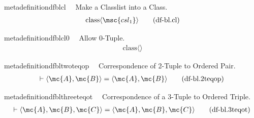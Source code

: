 \begin{restatable}{metadefinition}{dfblcl}~~ Make a Classlist into a Class.
\begin{align}
\,\mathrm{class} \langle \msc{csl_1} \rangle\label{eq:df-bl.cl}\tag{df-bl.cl}
\end{align}
\end{restatable}

\begin{restatable}{metadefinition}{dfblcl0}~~ Allow 0-Tuple.
\begin{align}
\,\mathrm{class} \langle \rangle\label{eq:df-bl.cl0}\tag{df-bl.cl0}
\end{align}
\end{restatable}

\begin{restatable}{metadefinition}{dfbltwoteqop}~~ Correspondence of 2-Tuple to
Ordered Pair.
\begin{align}
\vdash \langle \mc{A} , \mc{B} \rangle = \langle \mc{A} , \mc{B}
    \rangle\label{eq:df-bl.2teqop}\tag{df-bl.2teqop}
\end{align}
\end{restatable}

\begin{restatable}{metadefinition}{dfblthreeteqot}~~ Correspondence of a 3-Tuple to
Ordered Triple.
\begin{align}
\vdash \langle \mc{A} , \mc{B} , \mc{C} \rangle = \langle \mc{A} , \mc{B} ,
    \mc{C} \rangle\label{eq:df-bl.3teqot}\tag{df-bl.3teqot}
\end{align}
\end{restatable}

